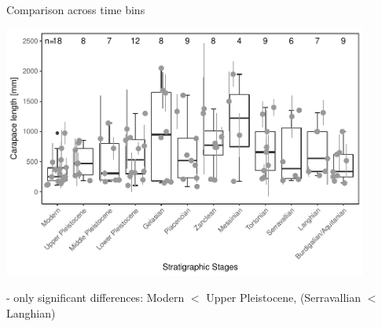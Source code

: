 \begin{frame}{Comparison across time bins}
\begin{center}
	\includegraphics[width=0.9\textwidth]{MA_JJ_files/figure-latex/BPGBins-1.pdf}
	
\end{center}

- only significant differences:
Modern $<$ Upper Pleistocene, (Serravallian $<$ Langhian)
\end{frame}



